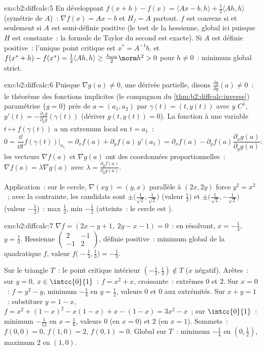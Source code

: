 \begin{solution}{exo:b2:diffcalc:5}
En développant $f(x + h) - f(x) = \langle Ax - b, h\rangle +
\frac12\langle Ah, h\rangle$ (symétrie de $A$)~: $\nabla f(x) = Ax -
b$ et $H_f = A$ partout. $f$ est convexe si et seulement si $A$ est
semi-définie positive (le test de la hessienne, global ici puisque
$H$ est constante~: la formule de Taylor du second  est exacte).
Si $A$ est définie positive~: l'unique point critique est $x^* =
A^{-1}b$, et $f(x^* + h) - f(x^*) = \frac12\langle Ah, h\rangle \geq
\frac{\lambda_{\min}}{2}\norm h^2 > 0$ pour $h \neq 0$~: minimum
global strict.
\end{solution}

\begin{solution}{exo:b2:diffcalc:6}
Puisque $\nabla g(a) \neq 0$, une dérivée partielle, disons
$\frac{\partial g}{\partial y}(a) \neq 0$~: le théorème des fonctions
implicites (le compagnon du \cref{thm:b2:diffcalc:inverse}) paramétrise
$\{g = 0\}$ près de $a = (a_1, a_2)$ par $\gamma(t) = (t, y(t))$ avec
$y$ $C^1$, $y'(t) = -\frac{\partial_x g}{\partial_y g}(\gamma(t))$
(dériver $g(t, y(t)) = 0$). La fonction à une variable $t
\mapsto f(\gamma(t))$ a un extremum local en $t = a_1$~:
\[
0 = \frac{\dd}{\dd t}f(\gamma(t))\Big|_{a_1}
= \partial_x f(a) + \partial_y f(a)\,y'(a_1)
= \partial_x f(a) - \partial_yf(a)\frac{\partial_x
g(a)}{\partial_y g(a)} :
\]
les vecteurs $\nabla f(a)$ et $\nabla g(a)$ ont des coordonnées
proportionnelles~: $\nabla f(a) = \lambda \nabla g(a)$ avec $\lambda =
\frac{\partial_y f(a)}{\partial_y g(a)}$.

Application~: sur le cercle, $\nabla(xy) = (y, x)$ parallèle à
$(2x, 2y)$ force $y^2 = x^2$~; avec la contrainte, les candidats
sont $\pm\bigl(\tfrac{1}{\sqrt2}, \tfrac{1}{\sqrt2}\bigr)$ (valeur
$\frac12$) et $\pm\bigl(\tfrac{1}{\sqrt2},
-\tfrac{1}{\sqrt2}\bigr)$ (valeur $-\frac12$)~: max $\frac12$, min
$-\frac12$ (atteints~: le cercle est ).
\end{solution}

\begin{solution}{exo:b2:diffcalc:7}
$\nabla f = (2x - y + 1,\; 2y - x - 1) = 0$~: en résolvant, $x =
-\frac13$, $y = \frac13$. Hessienne $\begin{pmatrix} 2 & -1\\ -1 &
2\end{pmatrix}$, définie positive~: minimum global de la quadratique
$f$, valeur $f\bigl(-\frac13, \frac13\bigr) = -\frac13$.

Sur le triangle $T$~: le point critique intérieur $(-\frac13,
\frac13) \notin T$ ($x$ négatif). Arêtes~: sur $y = 0$, $x \in
\intcc{0}{1}$~: $f = x^2 + x$, croissante~: extrêmes $0$ et $2$. Sur
$x = 0$~: $f = y^2 - y$, minimum $-\frac14$ en $y = \frac12$, valeurs
$0$ et $0$ aux extrémités. Sur $x + y = 1$~: substituer $y = 1 - x$,
$f = x^2 + (1-x)^2 - x(1-x) + x - (1-x) = 3x^2 - x$~; sur
$\intcc{0}{1}$~: minimum $-\frac{1}{12}$ en $x = \frac16$, valeurs
$0$ (en $x=0$) et $2$ (en $x=1$). Sommets~: $f(0,0) = 0$, $f(1,0)
= 2$, $f(0,1) = 0$. Global sur $T$~: minimum $-\frac14$ en $(0,
\frac12)$, maximum $2$ en $(1, 0)$.
\end{solution}


